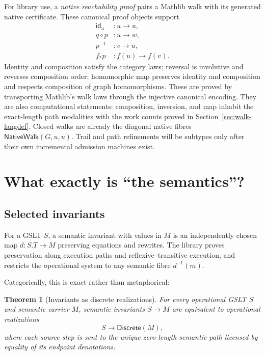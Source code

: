 \documentclass[11pt]{article}
\newtheorem{theorem}{Theorem}
\theoremstyle{remark}
\begin{document}
For library use, a \emph{native reachability proof} pairs a Mathlib walk with
its generated native certificate.  These canonical proof objects support
\[
\begin{aligned}
  \mathsf{id}_u &: u\longrightarrow u,\\
  q\circ p &: u\longrightarrow w,\\
  p^{-1} &: v\longrightarrow u,\\
  f_*p &: f(u)\longrightarrow f(v).
\end{aligned}
\]
Identity and composition satisfy the category laws; reversal is involutive
and reverses composition order; homomorphic map preserves identity and
composition and respects composition of graph homomorphisms.  These are
proved by transporting Mathlib's walk laws through the injective canonical
encoding.  They are also computational statements: composition, inversion,
and map inhabit the exact-length path modalities with the work counts proved
in Section~\ref{sec:walk-langdef}.  Closed walks are already the diagonal
native fibres \(\mathsf{NativeWalk}(G,u,u)\).  Trail and path refinements will
be subtypes only after their own incremental admission machines exist.

\section{What exactly is ``the semantics''?}
\label{sec:semantics}

\subsection{Selected invariants}

For a GSLT \(S\), a semantic invariant with values in \(M\) is an independently
chosen map \(d:S.T\to M\) preserving equations and rewrites.  The library
proves preservation along execution paths and reflexive--transitive execution,
and restricts the operational system to any semantic fibre \(d^{-1}(m)\).

Categorically, this is exact rather than metaphorical:
\begin{theorem}[Invariants as discrete realizations]
For every operational GSLT \(S\) and semantic carrier \(M\), semantic
invariants \(S\to M\) are equivalent to operational realizations
\[
  S\longrightarrow \mathsf{Discrete}(M),
\]
where each source step is sent to the unique zero-length semantic path licensed
by equality of its endpoint denotations.
\end{theorem}
\end{document}
